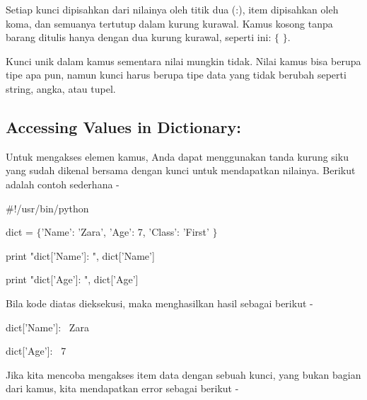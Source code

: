 
\noindent 
Setiap kunci dipisahkan dari nilainya oleh titik dua (:), item dipisahkan oleh koma, dan semuanya tertutup dalam kurung kurawal. Kamus kosong tanpa barang ditulis hanya dengan dua kurung kurawal, seperti ini:  $  \{  $ $  \}  $. \par
\noindent 
Kunci unik dalam kamus sementara nilai mungkin tidak. Nilai kamus bisa berupa tipe apa pun, namun kunci harus berupa tipe data yang tidak berubah seperti string, angka, atau tupel. \par
\vspace{12pt}
\subsection*{Accessing Values in Dictionary:}
 \par
\begin{adjustwidth}{0.03in}{0.03in}
Untuk mengakses elemen kamus, Anda dapat menggunakan tanda kurung siku yang sudah dikenal bersama dengan kunci untuk mendapatkan nilainya. Berikut adalah contoh sederhana -\end{adjustwidth}
 \par
\noindent 
 \hspace*{0.5in}  $  \#  $!/usr/bin/python \par
\vspace{12pt}
\noindent 
 \hspace*{0.5in} dict =  $  \{  $'Name': 'Zara', 'Age': 7, 'Class': 'First' $  \}  $ \par
\vspace{12pt}
\noindent 
 \hspace*{0.5in} print "dict['Name']: ", dict['Name'] \par
\noindent 
 \hspace*{0.5in} print "dict['Age']: ", dict['Age'] \par
\begin{adjustwidth}{0.03in}{0.03in}
Bila kode diatas dieksekusi, maka menghasilkan hasil sebagai berikut -\end{adjustwidth}
 \par
\noindent 
{\fontsize{9pt}{9pt}\selectfont  \hspace*{0.5in} dict['Name']:~ Zara} \par
\noindent 
{\fontsize{9pt}{9pt}\selectfont  \hspace*{0.5in} dict['Age']:~ 7} \par
\begin{adjustwidth}{0.03in}{0.03in}
Jika kita mencoba mengakses item data dengan sebuah kunci, yang bukan bagian dari kamus, kita mendapatkan error sebagai berikut -\end{adjustwidth}
